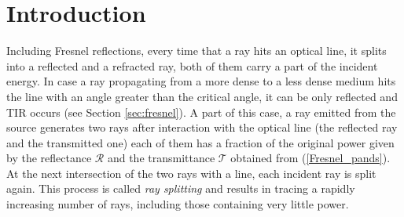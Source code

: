 \section{Introduction}
Including Fresnel reflections, every time that a ray hits an optical line, it splits into a reflected and a refracted ray, both of them carry a part of the incident energy. In case a ray propagating from a more dense to a less dense medium hits the line with an angle greater than the critical angle, it can be only reflected and TIR occurs (see Section \ref{sec:fresnel}).
A part of this case, a ray emitted from the source generates two rays after interaction with the optical line (the reflected ray and the transmitted one) each of them has a fraction of the original power given by the reflectance $\mathcal{R}$ and the transmittance $\mathcal{T}$ obtained from (\ref{Fresnel_pands}).
At the next intersection of the two rays with a line, each incident ray is split
again. This process is called \textit{ray splitting} and results in tracing a rapidly increasing number of rays, including those containing very little power. 

